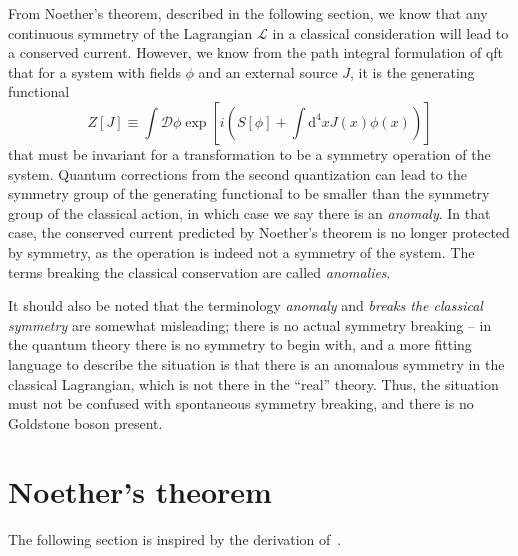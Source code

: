 
From Noether's theorem, described in the following section, we know that any continuous symmetry of the Lagrangian $\mathcal{L}$ in a classical consideration will lead to a conserved current.
However, we know from the path integral formulation of \gls{qft} that for a system with fields $\phi $ and an external source $J$, it is the generating functional
\begin{equation}
  \label{eq:generating_functional}
  Z[J] \equiv
  \int \mathcal{D}\phi 
  \exp \left[
  i \left( S[\phi] + \int \mathrm{d}^4x J(x) \phi(x) \right)
  \right] 
\end{equation}
that must be invariant for a transformation to be a symmetry operation of the system.
Quantum corrections from the second quantization can lead to the symmetry group of the generating functional to be smaller than the symmetry group of the classical action, in which case we say there is an \emph{anomaly}.
In that case, the conserved current predicted by Noether's theorem is no longer protected by symmetry, as the operation is indeed not a symmetry of the system.
The terms breaking the classical conservation are called \emph{anomalies}.

It should also be noted that the terminology \emph{anomaly} and \emph{breaks the classical symmetry} are somewhat misleading;
there is no actual symmetry breaking -- in the quantum theory there is no symmetry to begin with, and a more fitting language to describe the situation is that there is an anomalous symmetry in the classical Lagrangian, which is not there in the ``real'' theory.
Thus, the situation must not be confused with spontaneous symmetry breaking, and there is no Goldstone boson present.

\section{Noether's theorem}
The following section is inspired by the derivation of~\textcite{kachelriessQuantumFieldsHubble2018}.

